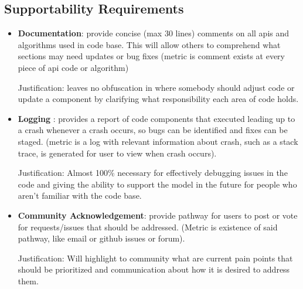 \documentclass[12pt]{article}
\begin{document}
\subsection{Supportability Requirements}
\begin{itemize}
    \item \textbf{Documentation}: provide concise (max 30 lines) comments on 
    all apis and algorithms used in code base. This will allow others to 
    comprehend what sections may need updates or bug fixes (metric is 
    comment exists at every piece of api code or algorithm)
    
    Justification: leaves no obfuscation in where somebody should adjust 
    code or update a component by clarifying what responsibility each area
     of code holds.

    \item \textbf{Logging }: provides a report of code components that 
    executed leading up to a crash whenever a crash occurs, so bugs can 
    be identified and fixes can be staged. (metric is a log with relevant 
    information about crash, such as a stack trace, is generated for user 
    to view when crash occurs).

    Justification: Almost 100\% necessary for effectively debugging issues in
     the code and giving the ability to support the model in the future for 
     people who aren't familiar with the code base.

    \item \textbf{Community Acknowledgement}: provide pathway for users to post
     or vote for requests/issues that should be addressed. (Metric is existence
      of said pathway, like email or github issues or forum).

    Justification: Will highlight to community what are current pain points 
    that should be prioritized and communication about how it is desired to 
    address them.

\end{itemize}
\end{document}
